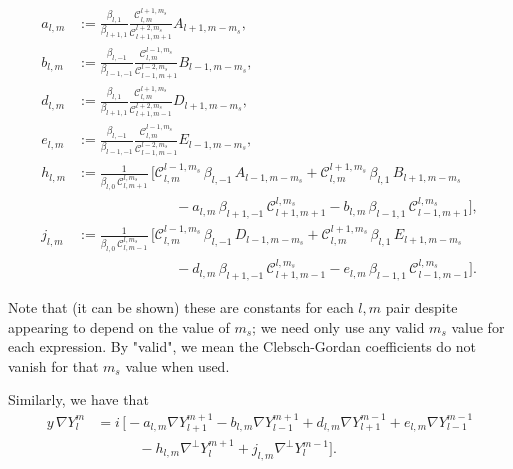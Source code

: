 \documentclass[11pt, oneside]{article}   	%
\newcommand{\gradY}{\nabla Y}
\newcommand{\gradYlm}{\nabla Y^m_l}
\newcommand{\gradpY}{\nabla^\perp Y}
\newcommand{\blone}{\beta_{l, 1}}
\newcommand{\blzero}{\beta_{l, 0}}
\newcommand{\blmone}{\beta_{l, -1}}
\newcommand{\cgcoeff}{\mathcal{C}}
\newcommand{\alm}{a_{l,m}}
\newcommand{\blm}{b_{l,m}}
\newcommand{\dlm}{d_{l,m}}
\newcommand{\elm}{e_{l,m}}
\newcommand{\hlm}{h_{l,m}}
\newcommand{\jlm}{j_{l,m}}
\begin{document}
\begin{align}
\alm &:= \frac{\blone}{\beta_{l+1,1}} \frac{\cgcoeff^{l+1,m_s}_{l,m}}{\cgcoeff^{l+2,m_s}_{l+1,m+1}} A_{l+1,m-m_s}, \\
\blm &:= \frac{\blmone}{\beta_{l-1,-1}} \frac{\cgcoeff^{l-1,m_s}_{l,m}}{\cgcoeff^{l-2,m_s}_{l-1,m+1}} B_{l-1,m-m_s}, \\
\dlm &:= \frac{\blone}{\beta_{l+1,1}} \frac{\cgcoeff^{l+1,m_s}_{l,m}}{\cgcoeff^{l+2,m_s}_{l+1,m-1}} D_{l+1,m-m_s}, \\
\elm &:= \frac{\blmone}{\beta_{l-1,-1}} \frac{\cgcoeff^{l-1,m_s}_{l,m}}{\cgcoeff^{l-2,m_s}_{l-1,m-1}} E_{l-1,m-m_s}, \\
\hlm &:= \frac{1}{\blzero \, \cgcoeff^{l,m_s}_{l, m+1}} \, \Big[ \cgcoeff^{l-1,m_s}_{l,m} \, \blmone \, A_{l-1,m-m_s} + \cgcoeff^{l+1,m_s}_{l,m} \, \blone \, B_{l+1,m-m_s} \nonumber \\
& \quad \quad \quad \quad \quad \quad \quad - \alm \, \beta_{l+1,-1} \, \cgcoeff^{l,m_s}_{l+1,m+1} - \blm \, \beta_{l-1,1} \, \cgcoeff^{l,m_s}_{l-1,m+1} \Big], \\
\jlm &:= \frac{1}{\blzero \, \cgcoeff^{l,m_s}_{l, m-1}} \, \Big[ \cgcoeff^{l-1,m_s}_{l,m} \, \blmone \, D_{l-1,m-m_s} + \cgcoeff^{l+1,m_s}_{l,m} \, \blone \, E_{l+1,m-m_s} \nonumber \\
& \quad \quad \quad \quad \quad \quad \quad - \dlm \, \beta_{l+1,-1} \, \cgcoeff^{l,m_s}_{l+1,m-1} - \elm \, \beta_{l-1,1} \, \cgcoeff^{l,m_s}_{l-1,m-1} \Big].
\end{align}

Note that (it can be shown) these are constants for each \(l,m\) pair despite appearing to depend on the value of \(m_s\); we need only use any valid \(m_s\) value for each expression. By "valid", we mean the Clebsch-Gordan coefficients do not vanish for that \(m_s\) value when used. 

Similarly, we have that
\begin{align}
y \,\gradYlm &= i \, \Big[ -\alm \gradY^{m+1}_{l+1} - \blm \gradY^{m+1}_{l-1} + \dlm \gradY^{m-1}_{l+1} + \elm \gradY^{m-1}_{l-1} \nonumber \\
& \quad \quad \quad - \hlm \gradpY^{m+1}_{l} + \jlm \gradpY^{m-1}_{l} \Big].
\end{align}
\end{document}
